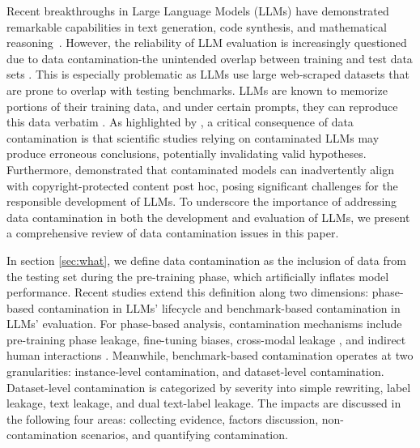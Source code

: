 \label{sec:introduction}

Recent breakthroughs in Large Language Models (LLMs) have demonstrated remarkable capabilities in text generation, code synthesis, and mathematical reasoning~\cite{zhao2023survey,openai2024gpt4technicalreport,deepseekai2025deepseekr1incentivizingreasoningcapability}.
However, the reliability of LLM evaluation is increasingly questioned due to data contamination-the unintended overlap between training and test data sets \cite{balloccu-etal-2024-leak,chang2024survey}. This is especially problematic as LLMs use large web-scraped datasets that are prone to overlap with testing benchmarks. 
LLMs are known to memorize portions of their training data, and under certain prompts, they can reproduce this data verbatim \cite{carlini2022quantifying}. As highlighted by \cite{sainz-etal-2023-nlp}, a critical consequence of data contamination is that scientific studies relying on contaminated LLMs may produce erroneous conclusions, potentially invalidating valid hypotheses. Furthermore, \citet{ippolito-etal-2023-preventing} demonstrated that contaminated models can inadvertently align with copyright-protected content post hoc, posing significant challenges for the responsible development of LLMs. To underscore the importance of addressing data contamination in both the development and evaluation of LLMs, we present a comprehensive review of data contamination issues in this paper.

In section \ref{sec:what}, we define data contamination as the inclusion of data from the testing set during the pre-training phase, which artificially inflates model performance. Recent studies extend this definition along two dimensions: phase-based contamination in LLMs' lifecycle and benchmark-based contamination in LLMs' evaluation. For phase-based analysis, contamination mechanisms include pre-training phase leakage, fine-tuning biases, cross-modal leakage \cite{yao-etal-2024-data}, and indirect human interactions \cite{palavalli-etal-2024-taxonomy}. Meanwhile, benchmark-based contamination operates at two granularities: instance-level contamination, and dataset-level contamination. Dataset-level contamination is categorized by severity into simple rewriting, label leakage, text leakage, and dual text-label leakage. The impacts are discussed in the following four areas: collecting evidence, factors discussion, non-contamination scenarios, and quantifying contamination.

